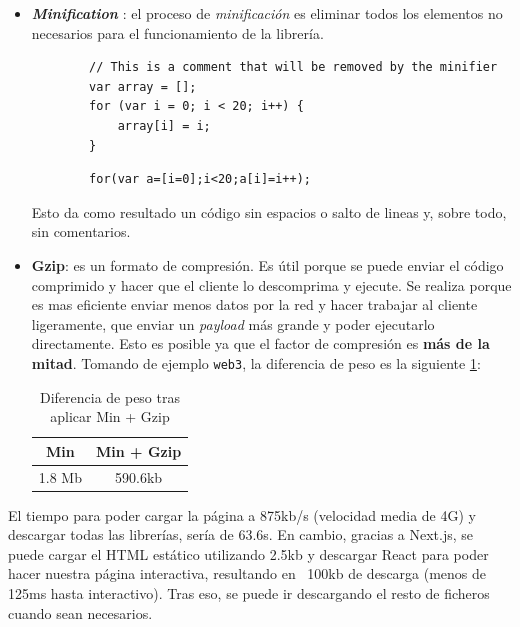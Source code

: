 \begin{itemize}
    \item \textbf{\textit{Minification}} \cite{web:mini}: el proceso de \textit{minificación} es eliminar todos los elementos no necesarios para el funcionamiento de la librería.
    \begin{lstlisting}
        // This is a comment that will be removed by the minifier
        var array = [];
        for (var i = 0; i < 20; i++) {
            array[i] = i;
        }
    \end{lstlisting}
    \begin{lstlisting}
        for(var a=[i=0];i<20;a[i]=i++);
    \end{lstlisting}
    Esto da como resultado un código sin espacios o salto de lineas y, sobre todo, sin comentarios.
    \item \textbf{Gzip}: es un formato de compresión. Es útil porque se puede enviar el código comprimido y hacer que el cliente lo descomprima y ejecute. Se realiza porque es mas eficiente enviar menos datos por la red y hacer trabajar al cliente ligeramente, que enviar un \textit{payload} más grande y poder ejecutarlo directamente. Esto es posible ya que el factor de compresión es \textbf{más de la mitad}.
    Tomando de ejemplo \verb|web3|, la diferencia de peso es la siguiente \ref{fg:peso}:
    \begin{table}[h!]
        \centering
        \begin{tabular}{|c|c|}
        \hline
        Min     & Min + Gzip    \\
        \hline
        1.8 Mb  & 590.6kb       \\
        \hline
        \end{tabular}
        \caption{Diferencia de peso tras aplicar Min + Gzip}
        \label{fg:peso}
    \end{table}
\end{itemize}
El tiempo para poder cargar la página a 875kb/s (velocidad media de 4G) y descargar todas las librerías, sería de 63.6s. En cambio, gracias a Next.js, se puede cargar el HTML estático utilizando 2.5kb y descargar React para poder hacer nuestra página interactiva, resultando en ~100kb de descarga (menos de 125ms hasta interactivo). Tras eso, se puede ir descargando el resto de ficheros cuando sean necesarios.
